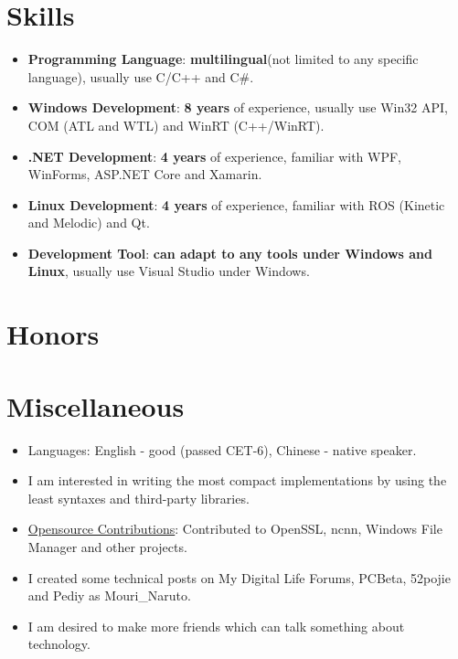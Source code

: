 \documentclass{resume}
\begin{document}
\section{Skills}
\begin{itemize}

  \item \textbf{Programming Language}:
    \textbf{multilingual}(not limited to any specific language), usually use C/C++ and C\#.

  \item \textbf{Windows Development}:
    \textbf{8 years} of experience, usually use Win32 API, COM (ATL and WTL) and WinRT (C++/WinRT).

  \item \textbf{.NET Development}:
    \textbf{4 years} of experience, familiar with WPF, WinForms, ASP.NET Core and Xamarin.
  
  \item \textbf{Linux Development}:
    \textbf{4 years} of experience, familiar with ROS (Kinetic and Melodic) and Qt.

  \item \textbf{Development Tool}:
    \textbf{can adapt to any tools under Windows and Linux}, usually use Visual Studio under Windows.

\end{itemize}

\section{Honors}


\section{Miscellaneous}
\begin{itemize}

  \item Languages: English - good (passed CET-6),  Chinese - native speaker.

  \item I am interested in writing the most compact implementations by using the least syntaxes and third-party libraries.

  \item \href{https://github.com/search?q=is%3Apr+author%3AMouriNaruto&type=Issues}{Opensource Contributions}: Contributed to OpenSSL, ncnn, Windows File Manager and other projects.
  
  \item I created some technical posts on My Digital Life Forums, PCBeta, 52pojie and Pediy as Mouri\_Naruto.
  
  \item I am desired to make more friends which can talk something about technology.
  
\end{itemize}
\end{document}
